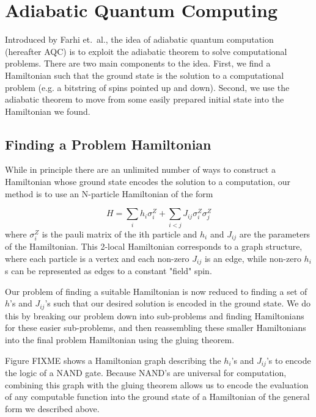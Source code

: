 \documentclass[12pt]{dalthesis}
\begin{document}
\chapter{Adiabatic Quantum Computing}
Introduced by Farhi et.\ al.\cite{farhi}, the idea of adiabatic quantum computation (hereafter AQC) is to exploit the adiabatic theorem to solve computational problems.  There are two main components to the idea.  First, we find a Hamiltonian such that the ground state is the solution to a computational problem (e.g. a bitstring of spins pointed up and down).  Second, we use the adiabatic theorem to move from some easily prepared initial state into the Hamiltonian we found.

\section{Finding a Problem Hamiltonian}
While in principle there are an unlimited number of ways to construct a Hamiltonian whose ground state encodes the solution to a computation, our method is to use an N-particle Hamiltonian of the form

\begin{displaymath}
	H = \sum_{i} h_i \sigma_i^Z + \sum_{i < j} J_{ij} \sigma_i^Z\sigma_j^Z 
\end{displaymath}
where $\sigma_i^Z$ is the pauli matrix of the ith particle and $h_i$ and $J_{ij}$ are the parameters of the Hamiltonian.  This 2-local Hamiltonian corresponds to a graph structure, where each particle is a vertex and each non-zero $J_{ij}$ is an edge, while non-zero $h_i$s can be represented as edges to a constant "field" spin.

Our problem of finding a suitable Hamiltonian is now reduced to finding a set of $h$'s and $J_{ij}$'s such that our desired solution is encoded in the ground state.  We do this by breaking our problem down into sub-problems and finding Hamiltonians for these easier sub-problems, and then reassembling these smaller Hamiltonians into the final problem Hamiltonian using the gluing theorem.\cite{gluing}

Figure FIXME shows a Hamiltonian graph describing the $h_i$'s and $J_{ij}$'s to encode the logic of a NAND gate.  Because NAND's are universal for computation, combining this graph with the gluing theorem allows us to encode the evaluation of any computable function into the ground state of a Hamiltonian of the general form we described above.  
\end{document}
